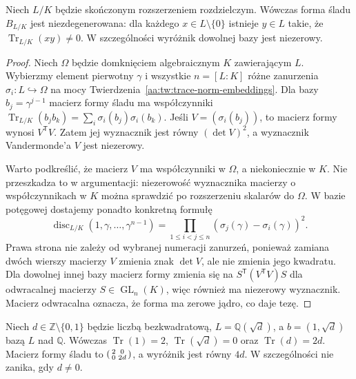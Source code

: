 \begin{twierdzenie}
\label{aa:tw:trace-nondegenerate}
Niech $L/K$ będzie skończonym rozszerzeniem rozdzielczym.
Wówczas forma śladu $B_{L/K}$ jest niezdegenerowana: dla każdego
$x\in L\setminus\{0\}$ istnieje $y\in L$ takie, że
$\operatorname{Tr}_{L/K}(xy)\ne0$. W szczególności
wyróżnik dowolnej bazy jest niezerowy.
\end{twierdzenie}
\begin{proof}
Niech $\Omega$ będzie domknięciem algebraicznym $K$
zawierającym $L$. Wybierzmy element pierwotny $\gamma$
i wszystkie $n=[L:K]$ różne zanurzenia
$\sigma_i:L\hookrightarrow\Omega$ na mocy
Twierdzenia~\ref{aa:tw:trace-norm-embeddings}. Dla bazy
$b_j=\gamma^{j-1}$ macierz formy śladu ma
współczynniki
$\operatorname{Tr}_{L/K}(b_jb_k)=\sum_i\sigma_i(b_j)\sigma_i(b_k)$.
Jeśli $V=(\sigma_i(b_j))$, to macierz formy wynosi
$V^{\mathsf T}V$. Zatem jej wyznacznik jest równy
$(\det V)^2$, a wyznacznik Vandermonde'a $V$ jest niezerowy.

Warto podkreślić, że macierz $V$ ma współczynniki w $\Omega$,
a niekoniecznie w $K$. Nie przeszkadza to w argumentacji:
niezerowość wyznacznika macierzy o współczynnikach w $K$
można sprawdzić po rozszerzeniu skalarów do $\Omega$.
W bazie potęgowej dostajemy ponadto konkretną formułę
\[
\operatorname{disc}_{L/K}(1,\gamma,\ldots,\gamma^{n-1})
=\prod_{1\le i<j\le n}(\sigma_j(\gamma)-\sigma_i(\gamma))^2.
\]
Prawa strona nie zależy od wybranej numeracji zanurzeń,
ponieważ zamiana dwóch wierszy macierzy $V$ zmienia
znak $\det V$, ale nie zmienia jego kwadratu.
Dla dowolnej innej bazy macierz formy zmienia się
na $S^{\mathsf T}(V^{\mathsf T}V)S$ dla odwracalnej
macierzy $S\in\operatorname{GL}_n(K)$, więc również
ma niezerowy wyznacznik. Macierz odwracalna oznacza,
że forma ma zerowe jądro, co daje tezę.
\end{proof}

\begin{przyklad}
\label{aa:prz:quadratic-discriminant}
Niech $d\in\mathbb Z\setminus\{0,1\}$ będzie liczbą
bezkwadratową, $L=\mathbb Q(\sqrt d)$, a
$b=(1,\sqrt d)$ bazą $L$ nad $\mathbb Q$.
Wówczas $\operatorname{Tr}(1)=2$,
$\operatorname{Tr}(\sqrt d)=0$ oraz
$\operatorname{Tr}(d)=2d$. Macierz formy śladu to
$\begin{psmallmatrix}2&0\\0&2d\end{psmallmatrix}$,
a wyróżnik jest równy $4d$. W szczególności
nie zanika, gdy $d\ne0$.
\end{przyklad}

